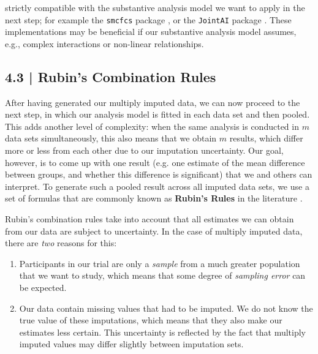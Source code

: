 \begin{box-info-continued}

strictly compatible with the substantive analysis model we want to apply in the next step; for example the \texttt{smcfcs} package \citep[which uses an FCS-based approach; ][]{smcfcs}, or the \texttt{JointAI} package \citep[which uses a joint Bayesian approach in which data are imputed and analyzed in one step;][]{jointai}. These implementations may be beneficial if our substantive analysis model assumes, e.g., complex interactions or non-linear relationships.

\end{box-info-continued}


\subsection{{\normalfont\textsf{\textcolor{sBlue}{\small 4.3 |}}} Rubin's Combination Rules}

After having generated our multiply imputed data, we can now proceed to the next step, in which our analysis model is fitted in each data set and then pooled. This adds another level of complexity: when the same analysis is conducted in $m$ data sets simultaneously, this also means that we obtain $m$ results, which differ more or less from each other due to our imputation uncertainty. Our goal, however, is to come up with one result (e.g. one estimate of the mean difference between groups, and whether this difference is significant) that we and others can interpret. To generate such a pooled result across all imputed data sets, we use a set of formulas that are commonly known as \textbf{Rubin's Rules} in the literature \citep[][chap. 2.4, 5.2]{rubin2004multiple, barnard1999miscellanea, fimd}. 

Rubin's combination rules take into account that all estimates we can obtain from our data are subject to uncertainty. In the case of multiply imputed data, there are \emph{two} reasons for this:

\begin{enumerate}
    \item Participants in our trial are only a \emph{sample} from a much greater population that we want to study, which means that some degree of \emph{sampling error} can be expected.
    \item Our data contain missing values that had to be imputed. We do not know the true value of these imputations, which means that they also make our estimates less certain. This uncertainty is reflected by the fact that multiply imputed values may differ slightly between imputation sets.
\end{enumerate}

